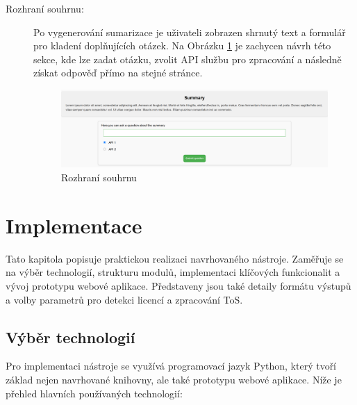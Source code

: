 \begin{description}
    \item[Rozhraní souhrnu:] Po vygenerování sumarizace je uživateli zobrazen shrnutý text a formulář pro kladení doplňujících otázek. Na Obrázku \ref{fig:summary.png} je zachycen návrh této sekce, kde lze zadat otázku, zvolit API službu pro zpracování a následně získat odpověď přímo na stejné stránce.  
    \begin{figure}[!htbp]
        \centering
        \includegraphics[width=\linewidth]{images/summary.png}
        \caption{Rozhraní souhrnu}
        \label{fig:summary.png}
    \end{figure}
\end{description}



\chapter{Implementace}
\begin{chapterabstract}
    Tato kapitola popisuje praktickou realizaci navrhovaného nástroje.
    Zaměřuje se na výběr technologií, strukturu modulů, implementaci klíčových funkcionalit a vývoj prototypu webové aplikace.
    Představeny jsou také detaily formátu výstupů a volby parametrů pro detekci licencí a zpracování ToS.
\end{chapterabstract}

\section{Výběr technologií}
Pro implementaci nástroje se využívá programovací jazyk Python, který tvoří základ nejen navrhované knihovny, ale také prototypu webové aplikace.
Níže je přehled hlavních používaných technologií:

